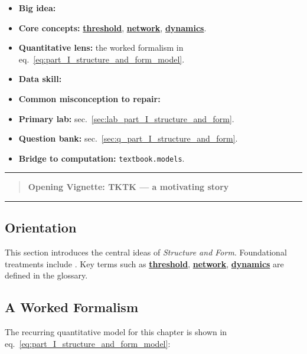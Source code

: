 \documentclass[
]{article}
\providecommand{\tightlist}{%
  \setlength{\itemsep}{0pt}\setlength{\parskip}{0pt}}
\theoremstyle{plain}
\theoremstyle{definition}
\begin{document}
\begin{itemize}
\tightlist
\item
  \textbf{Big idea:}
\item
  \textbf{Core concepts:} \hyperref[gl:threshold]{\textbf{threshold}},
  \hyperref[gl:network]{\textbf{network}},
  \hyperref[gl:dynamics]{\textbf{dynamics}}.
\item
  \textbf{Quantitative lens:} the worked formalism in
  eq.~\ref{eq:part_I_structure_and_form_model}.
\item
  \textbf{Data skill:}
\item
  \textbf{Common misconception to repair:}
\item
  \textbf{Primary lab:} sec.~\ref{sec:lab_part_I_structure_and_form}.
\item
  \textbf{Question bank:} sec.~\ref{sec:q_part_I_structure_and_form}.
\item
  \textbf{Bridge to computation:} \texttt{textbook.models}.
\end{itemize}

\begin{center}\rule{0.5\linewidth}{0.5pt}\end{center}

\begin{quote}
\textbf{Opening Vignette: TKTK --- a motivating story}
\end{quote}

\begin{center}\rule{0.5\linewidth}{0.5pt}\end{center}

\subsection{Orientation}\label{orientation-4}

This section introduces the central ideas of \emph{Structure and Form}.
Foundational treatments include
\citep{lee2021systems, garcia2022dynamics}. Key terms such as
\hyperref[gl:threshold]{\textbf{threshold}},
\hyperref[gl:network]{\textbf{network}},
\hyperref[gl:dynamics]{\textbf{dynamics}} are defined in the glossary.

\subsection{A Worked Formalism}\label{a-worked-formalism-4}

The recurring quantitative model for this chapter is shown in
eq.~\ref{eq:part_I_structure_and_form_model}:
\end{document}
